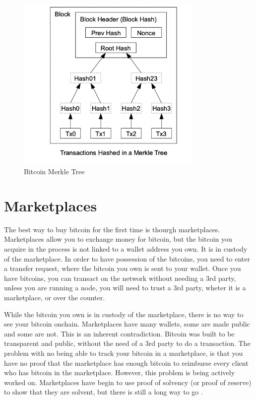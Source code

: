 \begin{figure}[ht!]
\centering
\includegraphics[width=90mm]{MerkleTree.png}
\caption{Bitcoin Merkle Tree \cite{N08}}
\label{overflow}
\end{figure}


\section{Marketplaces}
The best way to buy bitcoin for the first time is thourgh marketplaces. Marketplaces allow you to exchange money for bitcoin, but the bitcoin
you acquire in the process is not linked to a wallet address you own. It is in custody of the marketplace. In order to have possession of the bitcoins,
you need to enter a transfer request, where the bitcoin you own is sent to your wallet. Once you have bitcoins, you can transact on the network without needing
a 3rd party, unless you are running a node, you will need to trust a 3rd party, wheter it is a marketplace, or over the counter.

While the bitcoin you own is in custody of the marketplace, there is no way to see your bitcoin onchain. Marketplaces have many wallets, some are made public and some are not.
This is an inherent contradiction. Bitcoin was built to be transparent and public, without the need of a 3rd party to do a transaction.
The problem with no being able to track your bitcoin in a marketplace, is that you have no proof that the marketplace has enough bitcoin to reimburse
every client who has bitcoin in the marketplace.
However, this problem is being actively worked on. Marketplaces have begin to use proof of solvency (or proof of reserve) to show that they are solvent, but there is still a long way to go \cite{BPR}.


